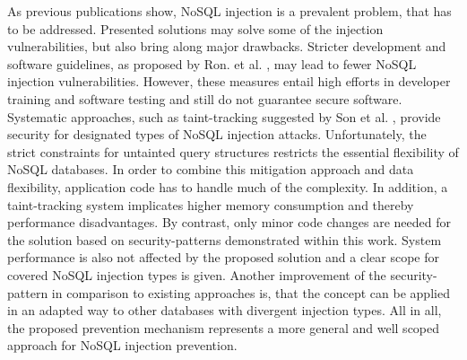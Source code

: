 As previous publications show, NoSQL injection is a prevalent problem, that has to be addressed. Presented solutions may solve some of the injection vulnerabilities, but also bring along major drawbacks. Stricter development and software guidelines, as proposed by Ron. et al. \cite{Ron:2016}, may lead to fewer NoSQL injection vulnerabilities. However, these measures entail high efforts in developer training and software testing and still do not guarantee secure software. Systematic approaches, such as taint-tracking suggested by Son et al. \cite{Son:2013}, provide security for designated types of NoSQL injection attacks. Unfortunately, the strict constraints for untainted query structures restricts the essential flexibility of NoSQL databases. In order to combine this mitigation approach and data flexibility, application code has to handle much of the complexity. In addition, a taint-tracking system implicates higher memory consumption and thereby performance disadvantages. By contrast, only minor code changes are needed for the solution based on security-patterns demonstrated within this work. System performance is also not affected by the proposed solution and a clear scope for covered NoSQL injection types is given. Another improvement of the security-pattern in comparison to existing approaches is, that the concept can be applied in an adapted way to other databases with divergent injection types. All in all, the proposed prevention mechanism represents a more general and well scoped approach for NoSQL injection prevention.